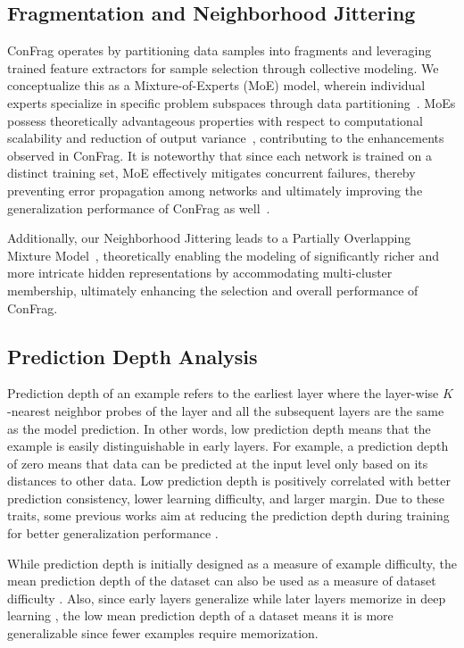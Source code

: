 \documentclass{article}
\theoremstyle{plain}
\theoremstyle{definition}
\theoremstyle{remark}
\begin{document}
\subsection{Fragmentation and Neighborhood Jittering}
\label{subsec:fragmentation_and_neighborhood_jittering}
ConFrag operates by partitioning data samples into fragments and leveraging trained feature extractors for sample selection through collective modeling. 
We conceptualize this as a Mixture-of-Experts (MoE) model, wherein individual experts specialize in specific problem subspaces through data partitioning~\citep{yuksel2012Moe,masoudnia2014Moe}. 
MoEs possess theoretically advantageous properties with respect to computational scalability and reduction of output variance~\citep{yuksel2012Moe}, contributing to the enhancements observed in ConFrag. 
It is noteworthy that since each network is trained on a distinct training set, MoE effectively mitigates concurrent failures, thereby preventing error propagation among networks and ultimately improving the generalization performance of ConFrag as well~\citep{sharkey1997}.

Additionally, our Neighborhood Jittering leads to a Partially Overlapping Mixture Model~\citep{heller2007}, theoretically enabling the modeling of significantly richer and more intricate hidden representations by accommodating multi-cluster membership, ultimately enhancing the selection and overall performance of ConFrag.

\subsection{Prediction Depth Analysis}
\label{subsec:prediction_depth_analysis}

Prediction depth \citep{baldock21nips} of an example refers to the earliest layer where the layer-wise $K$-nearest neighbor probes of the layer and all the subsequent layers are the same as the model prediction.
In other words, low prediction depth means that the example is easily distinguishable in early layers.
For example, a prediction depth of zero means that data can be predicted at the input level only based on its distances to other data.
Low prediction depth is positively correlated with better prediction consistency, lower learning difficulty, and larger margin.
Due to these traits, some previous works aim at reducing the prediction depth during training for better generalization performance \citep{zhou2021fortuitous, sarfi2023simulated}.

While prediction depth is initially designed as a measure of example difficulty, the mean prediction depth of the dataset can also be used as a measure of dataset difficulty \citep{baldock21nips}.
Also, since early layers generalize while later layers memorize in deep learning \citep{stephenson2021geometry}, the low mean prediction depth of a dataset means it is more generalizable since fewer examples require memorization.
\end{document}
